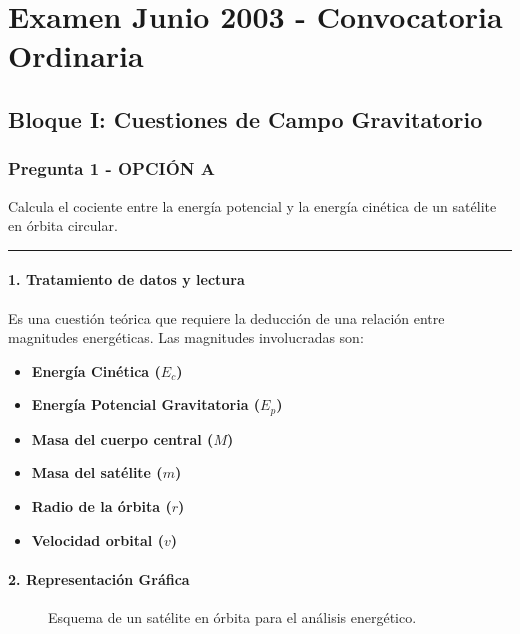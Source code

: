 \chapter{Examen Junio 2003 - Convocatoria Ordinaria}
\label{chap:2003_jun_ord}

\section{Bloque I: Cuestiones de Campo Gravitatorio}
\label{sec:grav_2003_jun_ord}

\subsection{Pregunta 1 - OPCIÓN A}
\label{subsec:1A_2003_jun_ord}

\begin{cajaenunciado}
Calcula el cociente entre la energía potencial y la energía cinética de un satélite en órbita circular.
\end{cajaenunciado}
\hrule

\subsubsection*{1. Tratamiento de datos y lectura}
Es una cuestión teórica que requiere la deducción de una relación entre magnitudes energéticas. Las magnitudes involucradas son:
\begin{itemize}
    \item \textbf{Energía Cinética ($E_c$)}
    \item \textbf{Energía Potencial Gravitatoria ($E_p$)}
    \item \textbf{Masa del cuerpo central ($M$)}
    \item \textbf{Masa del satélite ($m$)}
    \item \textbf{Radio de la órbita ($r$)}
    \item \textbf{Velocidad orbital ($v$)}
\end{itemize}

\subsubsection*{2. Representación Gráfica}
\begin{figure}[H]
    \centering
    \caption{Esquema de un satélite en órbita para el análisis energético.}
\end{figure}

